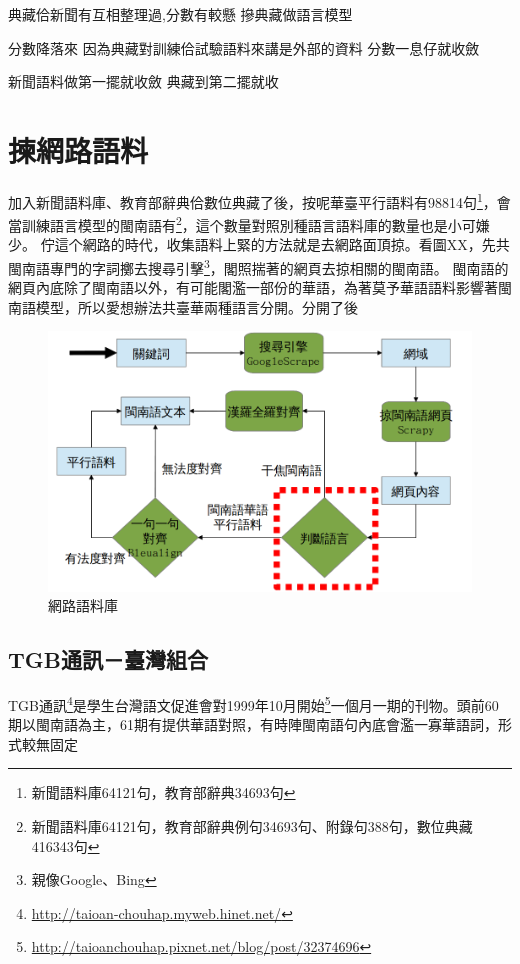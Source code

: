 \documentclass[final,oneside,onecolumn,12pt,a4paper]{book}%
\begin{document}
典藏佮新聞有互相整理過,分數有較懸
 摻典藏做語言模型


分數降落來
因為典藏對訓練佮試驗語料來講是外部的資料
 分數一息仔就收斂



新聞語料做第一擺就收斂
典藏到第二擺就收

\chapter{揀網路語料}
\label{章：揀網路語料}
加入新聞語料庫、教育部辭典佮數位典藏了後，按呢華臺平行語料有98814句\footnote{新聞語料庫64121句，教育部辭典34693句}，會當訓練語言模型的閩南語有\footnote{新聞語料庫64121句，教育部辭典例句34693句、附錄句388句，數位典藏416343句}，這个數量對照別種語言語料庫的數量也是小可嫌少。
佇這个網路的時代，收集語料上緊的方法就是去網路面頂掠。看圖XX，先共閩南語專門的字詞擲去搜尋引擊\footnote{親像Google、Bing}，閣照揣著的網頁去掠相關的閩南語。
閩南語的網頁內底除了閩南語以外，有可能閣濫一部份的華語，為著莫予華語語料影響著閩南語模型，所以愛想辦法共臺華兩種語言分開。分開了後


\begin{figure}
\centerline{\includegraphics[keepaspectratio]{圖/網路語料庫結構}}
\caption{網路語料庫}
\label{圖：網路語料庫結構}
\end{figure}

\section{TGB通訊－臺灣組合}
\label{節：TGB通訊－臺灣組合}
TGB通訊\footnote{\url{http://taioan-chouhap.myweb.hinet.net/}}是學生台灣語文促進會對1999年10月開始\footnote{\url{http://taioanchouhap.pixnet.net/blog/post/32374696}}一個月一期的刊物。頭前60期以閩南語為主，61期有提供華語對照，有時陣閩南語句內底會濫一寡華語詞，形式較無固定
\end{document}
